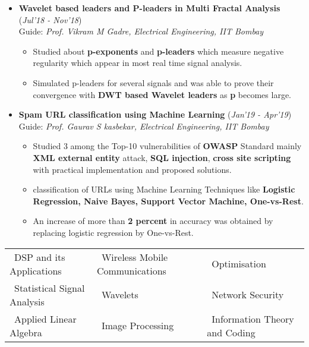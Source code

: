 \documentclass[10pt]{article}
\begin{document}
\begin{itemize}[leftmargin=0.4cm]
\item \textbf{Wavelet based leaders and P-leaders in Multi
Fractal Analysis} 
\hfill{(\textit{Jul'18 - Nov'18})}\\
Guide: \textit{Prof. Vikram M Gadre, Electrical Engineering, IIT Bombay}
	\begin{itemize}
	\item Studied about \textbf{p-exponents} and \textbf{p-leaders} which measure negative regularity which appear in most real time signal analysis.
	\item Simulated p-leaders for several signals and was able to prove their convergence with \textbf{DWT based Wavelet leaders} as \textbf{p} becomes large.


	\end{itemize}
	

\item \textbf{Spam URL classification using Machine Learning}
\hfill{(\textit{Jan'19 - Apr'19})}\\
Guide: \textit{Prof. Gaurav S kasbekar, Electrical Engineering, IIT Bombay}

	\begin{itemize}
	\item Studied 3 among the Top-10 vulnerabilities of \textbf{OWASP} Standard mainly \textbf{XML external entity} attack, \textbf{SQL injection}, \textbf{cross site scripting} with practical implementation and proposed solutions.
	\item classification of URLs using Machine Learning Techniques like \textbf{Logistic Regression, Naive Bayes, Support Vector Machine, One-vs-Rest}.
	\item An increase of more than \textbf{2 percent} in accuracy was obtained by replacing logistic regression by One-vs-Rest.
    \end{itemize}

	


\end{itemize}
\hspace{-0.17cm}\colorbox{bl}{}%
	 	
		\begin{tabular}{m{2.3in}m{2.3in}m{2.5in}}
		\hspace{0.55cm}\textbullet\ DSP and its Applications &  \textbullet\ Wireless Mobile Communications  & \textbullet\ Optimisation \\
		\hspace{0.55cm}\textbullet\ Statistical Signal Analysis & \textbullet\ Wavelets & \textbullet\ Network Security \\
		\hspace{0.55cm}\textbullet\ Applied Linear Algebra & \textbullet\ Image Processing & \textbullet\  Information Theory and Coding\\
	\end{tabular}
	
\end{document}

